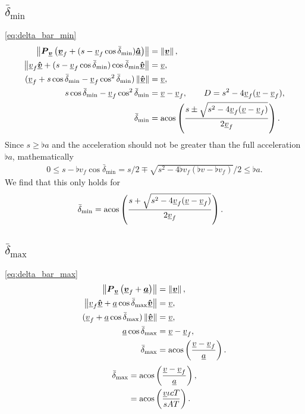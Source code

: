 \subsection{$\bar{\delta}_{\min}$}
\eqref{eq:delta_bar_min}
\begin{align*}
\norm{\projmat{\flat{v}} \left( \vec{\flat{v}}_f + (s - \flat{v}_f \cos\bar{\delta}_{\min})\uvec{\flat{a}} \right)} &= \norm{\vec{\flat{v}}},\\
\norm{\flat{v}_f \uvec{\flat{v}} + (s - \flat{v}_f \cos\bar{\delta}_{\min})\cos\bar{\delta}_{\min}\uvec{\flat{v}}} &= \flat{v},\\
(\flat{v}_f + s\cos\bar{\delta}_{\min} - \flat{v}_f \cos^2\bar{\delta}_{\min}) \norm{\uvec{\flat{v}}} &= \flat{v},\\
s\cos\bar{\delta}_{\min} - \flat{v}_f \cos^2\bar{\delta}_{\min} &= \flat{v} - \flat{v}_f, \qquad D = s^2 - 4 \flat{v}_f (\flat{v} - \flat{v}_f),\\
\bar{\delta}_{\min} &= \acos\left( \frac{s \pm \sqrt{s^2 - 4 \flat{v}_f (\flat{v} - \flat{v}_f)}}{2 \flat{v}_f} \right).\\
\end{align*}
Since $s \ge \flat{a}$ and the acceleration should not be greater than the full acceleration $\flat{a}$, mathematically
\begin{align*}
0 \le s - \flat{v}_f \cos\bar{\delta}_{\min} = s / 2 \mp \sqrt{s^2 - 4 \flat{v}_f (\flat{v} - \flat{v}_f)} \Big/ 2 \le \flat{a}.
\end{align*}
We find that this only holds for
\begin{align*}
\bar{\delta}_{\min} &= \acos\left( \frac{s + \sqrt{s^2 - 4 \flat{v}_f (\flat{v} - \flat{v}_f)}}{2 \flat{v}_f} \right).
\end{align*}


\subsection{$\bar{\delta}_{\max}$}
\eqref{eq:delta_bar_max}
\begin{align*}
\norm{\projmat{\flat{v}}\left( \vec{\flat{v}}_f + \vec{\flat{a}} \right)} &= \norm{\vec{\flat{v}}},\\
\norm{\flat{v}_f \uvec{\flat{v}} + \flat{a} \cos\bar{\delta}_{\max}\uvec{\flat{v}}} &= \flat{v},\\
(\flat{v}_f + \flat{a} \cos\bar{\delta}_{\max}) \norm{\uvec{\flat{v}}} &= \flat{v},\\
\flat{a} \cos\bar{\delta}_{\max} &= \flat{v} - \flat{v}_f,\\
\bar{\delta}_{\max} &= \acos\left( \frac{\flat{v} - \flat{v}_f}{\flat{a}} \right).
\end{align*}
\begin{align*}
\bar{\delta}_{\max} &= \acos\left( \frac{\flat{v} - \flat{v}_f}{\flat{a}} \right),\\
&= \acos\left( \frac{\flat{v} \iota cT}{sAT} \right).
\end{align*}

